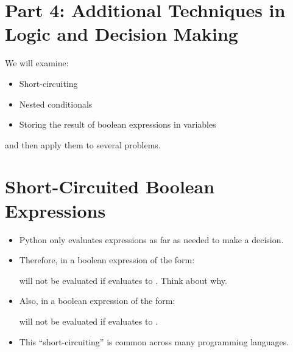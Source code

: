 \documentclass[letterpaper,10pt,english]{sphinxmanual}
\begin{document}
\section{Part 4: Additional Techniques in Logic and Decision Making}
\label{\detokenize{lecture_notes/lec11_conditionals2:part-4-additional-techniques-in-logic-and-decision-making}}
We will examine:
\begin{itemize}
\item {} 
Short-circuiting

\item {} 
Nested conditionals

\item {} 
Storing the result of boolean expressions in variables

\end{itemize}

and then apply them to several problems.


\section{Short-Circuited Boolean Expressions}
\label{\detokenize{lecture_notes/lec11_conditionals2:short-circuited-boolean-expressions}}\begin{itemize}
\item {} 
Python only evaluates expressions as far as needed to make a
decision.

\item {} 
Therefore, in a boolean expression of the form:

\begin{sphinxVerbatim}[commandchars=\\\{\}]
  
\end{sphinxVerbatim}

 will not be evaluated if  evaluates to .
Think about why.

\item {} 
Also, in a boolean expression of the form:

\begin{sphinxVerbatim}[commandchars=\\\{\}]
  
\end{sphinxVerbatim}

 will not be evaluated if  evaluates to .

\item {} 
This “short-circuiting” is common across many programming languages.

\end{itemize}
\end{document}
